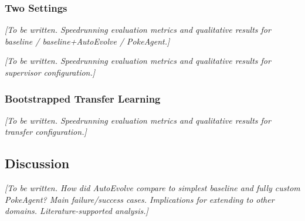 \subsubsection{Two Settings}\label{sec:three_settings_results}

\textit{[To be written. Speedrunning evaluation metrics and qualitative results for baseline / baseline+AutoEvolve / PokeAgent.]}


\textit{[To be written. Speedrunning evaluation metrics and qualitative results for supervisor configuration.]}

\subsubsection{Bootstrapped Transfer Learning}\label{sec:transfer_results}

\textit{[To be written. Speedrunning evaluation metrics and qualitative results for transfer configuration.]}

\subsection{Discussion}\label{sec:autoevolve_discussion}

\textit{[To be written. How did AutoEvolve compare to simplest baseline and fully custom PokeAgent? Main failure/success cases. Implications for extending to other domains. Literature-supported analysis.]}
